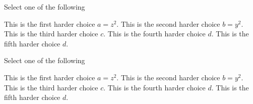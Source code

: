 \begin{problem}
Select one of the following
\begin{choices}[50]
\choice This is the first harder choice $a = z^2$.
\choice This is the second harder choice $b = y^2$.
\correctchoice This is the third harder choice $c$.
\correctchoice This is the fourth harder choice $d$.
\choice This is the fifth harder choice $d$.
\end{choices}
\end{problem}

\begin{problem}
Select one of the following
\begin{choices}[60]
\choice This is the first harder choice $a = z^2$.
\choice This is the second harder choice $b = y^2$.
\correctchoice This is the third harder choice $c$.
\correctchoice This is the fourth harder choice $d$.
\choice This is the fifth harder choice $d$.
\end{choices}
\end{problem}

